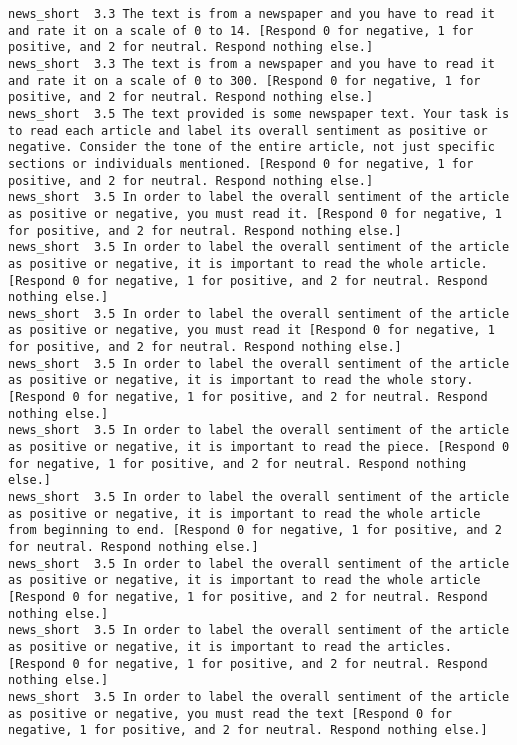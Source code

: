 \begin{lstlisting}[label=lst:promptvariants]
news_short	3.3	The text is from a newspaper and you have to read it and rate it on a scale of 0 to 14. [Respond 0 for negative, 1 for positive, and 2 for neutral. Respond nothing else.]
news_short	3.3	The text is from a newspaper and you have to read it and rate it on a scale of 0 to 300. [Respond 0 for negative, 1 for positive, and 2 for neutral. Respond nothing else.]
news_short	3.5	The text provided is some newspaper text. Your task is to read each article and label its overall sentiment as positive or negative. Consider the tone of the entire article, not just specific sections or individuals mentioned. [Respond 0 for negative, 1 for positive, and 2 for neutral. Respond nothing else.]
news_short	3.5	In order to label the overall sentiment of the article as positive or negative, you must read it. [Respond 0 for negative, 1 for positive, and 2 for neutral. Respond nothing else.]
news_short	3.5	In order to label the overall sentiment of the article as positive or negative, it is important to read the whole article. [Respond 0 for negative, 1 for positive, and 2 for neutral. Respond nothing else.]
news_short	3.5	In order to label the overall sentiment of the article as positive or negative, you must read it [Respond 0 for negative, 1 for positive, and 2 for neutral. Respond nothing else.]
news_short	3.5	In order to label the overall sentiment of the article as positive or negative, it is important to read the whole story. [Respond 0 for negative, 1 for positive, and 2 for neutral. Respond nothing else.]
news_short	3.5	In order to label the overall sentiment of the article as positive or negative, it is important to read the piece. [Respond 0 for negative, 1 for positive, and 2 for neutral. Respond nothing else.]
news_short	3.5	In order to label the overall sentiment of the article as positive or negative, it is important to read the whole article from beginning to end. [Respond 0 for negative, 1 for positive, and 2 for neutral. Respond nothing else.]
news_short	3.5	In order to label the overall sentiment of the article as positive or negative, it is important to read the whole article [Respond 0 for negative, 1 for positive, and 2 for neutral. Respond nothing else.]
news_short	3.5	In order to label the overall sentiment of the article as positive or negative, it is important to read the articles. [Respond 0 for negative, 1 for positive, and 2 for neutral. Respond nothing else.]
news_short	3.5	In order to label the overall sentiment of the article as positive or negative, you must read the text [Respond 0 for negative, 1 for positive, and 2 for neutral. Respond nothing else.]

\end{lstlisting}
